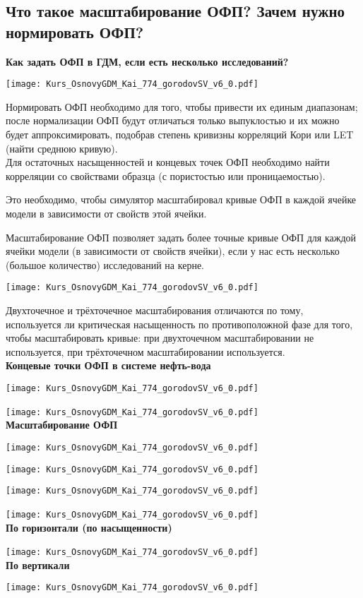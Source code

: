 

\subsection{Что такое масштабирование ОФП? Зачем нужно нормировать ОФП?}

\textbf{Как задать ОФП в ГДМ, если есть несколько исследований?}

\texttt{[image: Kurs\_OsnovyGDM\_Kai\_774\_gorodovSV\_v6\_0.pdf]}

Нормировать ОФП необходимо для того, чтобы привести их единым диапазонам; после нормализации ОФП будут отличаться только выпуклостью и их можно будет аппроксимировать, подобрав степень кривизны корреляций Кори или LET (найти среднюю кривую).
\\

Для остаточных насыщенностей и концевых точек ОФП необходимо найти корреляции со свойствами образца (с пористостью или проницаемостью).

Это необходимо, чтобы симулятор масштабировал кривые ОФП в каждой ячейке модели в зависимости от свойств этой ячейки.

Масштабирование ОФП позволяет задать более точные кривые ОФП для каждой ячейки модели (в зависимости от свойств ячейки), если у нас есть несколько (большое количество) исследований на керне.

\texttt{[image: Kurs\_OsnovyGDM\_Kai\_774\_gorodovSV\_v6\_0.pdf]}

Двухточечное и трёхточечное масштабирования отличаются по тому, используется ли критическая насыщенность по противоположной фазе для того, чтобы масштабировать кривые: при двухточечном масштабировании не используется, при трёхточечном масштабировании используется.
\\

\textbf{Концевые точки ОФП в системе нефть-вода}

\texttt{[image: Kurs\_OsnovyGDM\_Kai\_774\_gorodovSV\_v6\_0.pdf]}

\texttt{[image: Kurs\_OsnovyGDM\_Kai\_774\_gorodovSV\_v6\_0.pdf]}
\ \\

\textbf{Масштабирование ОФП}

\texttt{[image: Kurs\_OsnovyGDM\_Kai\_774\_gorodovSV\_v6\_0.pdf]}

\texttt{[image: Kurs\_OsnovyGDM\_Kai\_774\_gorodovSV\_v6\_0.pdf]}

\texttt{[image: Kurs\_OsnovyGDM\_Kai\_774\_gorodovSV\_v6\_0.pdf]}

\texttt{[image: Kurs\_OsnovyGDM\_Kai\_774\_gorodovSV\_v6\_0.pdf]}
\ \\

\textbf{По горизонтали (по насыщенности)}

\texttt{[image: Kurs\_OsnovyGDM\_Kai\_774\_gorodovSV\_v6\_0.pdf]}
\ \\

\textbf{По вертикали}

\texttt{[image: Kurs\_OsnovyGDM\_Kai\_774\_gorodovSV\_v6\_0.pdf]}

